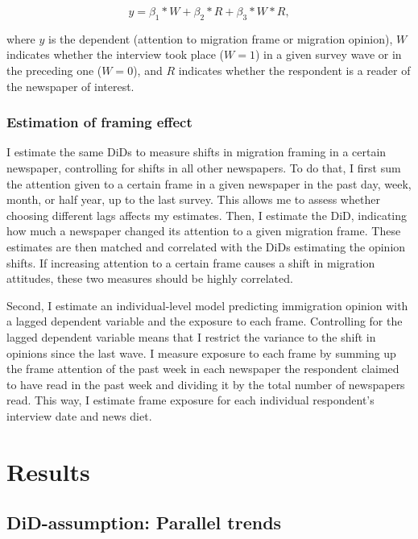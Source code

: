 \documentclass{article}
\begin{document}
$$ y = \beta_1 * W + \beta_2 * R + \beta_3 * W * R, $$

where $y$ is the dependent (attention to migration frame or migration opinion), $W$ indicates whether the interview took place ($W = 1$) in a given survey wave or in the preceding one ($W = 0$), and $R$ indicates whether the respondent is a reader of the newspaper of interest.


\subsubsection{Estimation of framing effect}\label{sec:models}

I estimate the same DiDs to measure shifts in migration framing in a certain newspaper, controlling for shifts in all other newspapers. To do that, I first sum the attention given to a certain frame in a given newspaper in the past day, week, month, or half year, up to the last survey. This allows me to assess whether choosing different lags affects my estimates. Then, I estimate the DiD, indicating how much a newspaper changed its attention to a given migration frame. These estimates are then matched and correlated with the DiDs estimating the opinion shifts. If increasing attention to a certain frame causes a shift in migration attitudes, these two measures should be highly correlated.

Second, I estimate an individual-level model predicting immigration opinion with a lagged dependent variable and the exposure to each frame. Controlling for the lagged dependent variable means that I restrict the variance to the shift in opinions since the last wave. I measure exposure to each frame by summing up the frame attention of the past week in each newspaper the respondent claimed to have read in the past week and dividing it by the total number of newspapers read. This way, I estimate frame exposure for each individual respondent's interview date and news diet.


\section{Results}

\subsection{DiD-assumption: Parallel trends}
\end{document}
